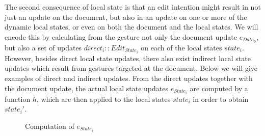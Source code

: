 The second consequence of local state is that an edit intention might result in not just an update on the document, but also in an update on one or more of the dynamic local states, or even on both the document and the local states. We will encode this by calculating from the gesture not only the document update $e_{Data_0}$, but also a set of updates $direct_i :: Edit_{State_i}$ on each of the local states $state_i$. However, besides direct local state updates, there also exist indirect local state updates which result from gestures targeted at the document. Below we will give examples of direct and indirect updates. From the direct updates together with the document update, the actual local state updates $e_{State_i}$ are computed by a function $h$, which are then applied to the local states $state_i$ in order to obtain $state_i'$.
\begin{figure}
\begin{small}
\begin{center}
\begin{center}
\begin{small}
\bigskip \noindent
{}
\end{small}
\end{center}\caption{Computation of $e_{State_i}$ }\label{estatecomputation} 
\end{center}
\end{small}
\end{figure}


